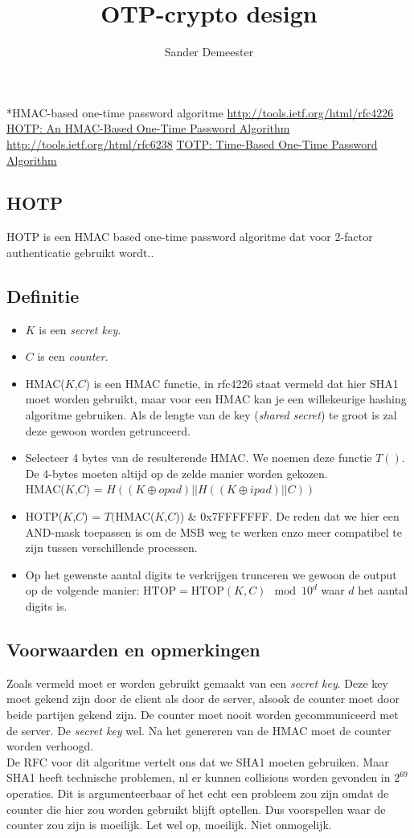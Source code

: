 \documentclass[10pt,a4paper]{report}
\author{Sander Demeester}
\title{OTP-crypto design}
\begin{document}
\begin{section}*{HMAC-based one-time password algoritme}
\url{http://tools.ietf.org/html/rfc4226}
\href{http://tools.ietf.org/html/rfc4226}{HOTP: An HMAC-Based One-Time Password Algorithm}\\
\url{http://tools.ietf.org/html/rfc6238}
\href{http://tools.ietf.org/html/rfc6238}{TOTP: Time-Based One-Time Password Algorithm}
\section*{HOTP}
HOTP is een HMAC based one-time password algoritme dat voor 2-factor authenticatie gebruikt wordt..\\

\subsection*{Definitie}
\begin{itemize}
\item $K$ is een \emph{secret key}.
\item $C$ is een \emph{counter}.
\item HMAC($K$,$C$) is een HMAC functie, in rfc4226 staat vermeld dat hier SHA1 moet worden gebruikt, maar voor een HMAC kan je een willekeurige hashing algoritme gebruiken. Als de lengte van de key (\emph{shared secret}) te groot is zal deze gewoon worden getrunceerd.
\item Selecteer 4 bytes van de resulterende HMAC. We noemen deze functie $T()$. De 4-bytes moeten altijd op de zelde manier worden gekozen.\\
HMAC($K$,$C$) = $H((K \oplus opad) || H((K \oplus ipad) || C))$
\item HOTP($K$,$C$) = $T($HMAC($K$,$C$)) \& 0x7FFFFFFF. De reden dat we hier een AND-mask toepassen is om de MSB weg te werken enzo meer compatibel te zijn tussen verschillende processen.
\item Op het gewenste aantal digits te verkrijgen trunceren we gewoon de output op de volgende manier:
$\text{HTOP} = \text{HTOP}(K,C) \mod 10^d$ waar $d$ het aantal digits is. 
\end{itemize}
\subsection*{Voorwaarden en opmerkingen}
Zoals vermeld moet er worden gebruikt gemaakt van een \emph{secret key}. Deze key moet gekend zijn door de client als door de server, alsook de counter moet door beide partijen gekend zijn. De counter moet nooit worden gecommuniceerd met de server. De \emph{secret key} wel. Na het genereren van de HMAC moet de counter worden verhoogd.\\
De RFC voor dit algoritme vertelt ons dat we SHA1 moeten gebruiken. Maar SHA1 heeft technische problemen, nl er kunnen collisions worden gevonden in $2^69$ operaties. Dit is argumenteerbaar of het echt een probleem zou zijn omdat de counter die hier zou worden gebruikt blijft optellen. Dus voorspellen waar de counter zou zijn is moeilijk. Let wel op, moeilijk. Niet onmogelijk. 

\end{section}
\end{document}
